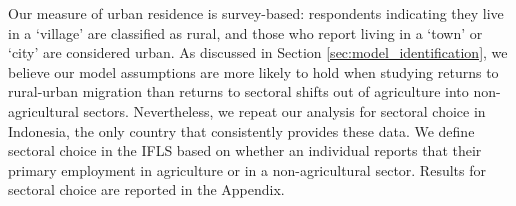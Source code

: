\documentclass[12pt]{article}
\begin{document}


Our measure of urban residence is survey-based: respondents indicating they live in a `village' are classified as rural, and those who report living in a `town' or `city' are considered urban. As discussed in Section \ref{sec:model_identification}, we believe our model assumptions are more likely to hold when studying returns to rural-urban migration than returns to sectoral shifts out of agriculture into non-agricultural sectors. Nevertheless, we repeat our analysis for sectoral choice in Indonesia, the only country that consistently provides these data. 
We define sectoral choice in the IFLS based on whether an individual reports that their primary employment in agriculture or in a non-agricultural sector.
Results for sectoral choice are reported in the Appendix.

\begin{landscape}

\end{landscape}
% 
\end{document}

